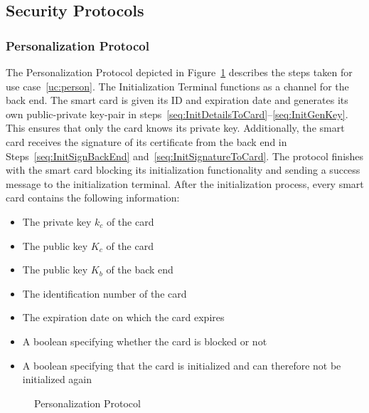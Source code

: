 \subsection{Security Protocols}
\subsubsection{Personalization Protocol} \label{sec:perProtocol}
The Personalization Protocol depicted in Figure~\ref{fig:PersonProtocol} describes the steps taken for use case~\ref{uc:person}.
The Initialization Terminal functions as a channel for the back end. 
The smart card is given its ID and expiration date and generates its own public-private key-pair in steps~\ref{seq:InitDetailsToCard}--\ref{seq:InitGenKey}.
This ensures that only the card knows its private key. 
Additionally, the smart card receives the signature of its certificate from the back end in Steps~\ref{seq:InitSignBackEnd} and~\ref{seq:InitSignatureToCard}.
The protocol finishes with the smart card blocking its initialization functionality and sending a success message to the initialization terminal. 
After the initialization process, every smart card contains the following information:
\begin{itemize}
    \item The private key $k_c$ of the card
    \item The public key $K_c$ of the card
    \item The public key $K_b$ of the back end
    \item The identification number of the card
    \item The expiration date on which the card expires
    \item A boolean specifying whether the card is blocked or not
    \item A boolean specifying that the card is initialized and can therefore not be initialized again
\end{itemize}

 \begin{figure}[h!]
     \centering
     
     \caption{Personalization Protocol}
     \label{fig:PersonProtocol}
 \end{figure}

